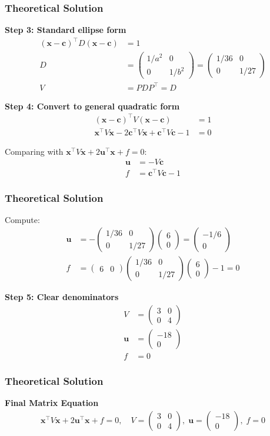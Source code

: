 \documentclass{beamer}
\theoremstyle{remark}
\newcommand{\myvec}[1]{\ensuremath{\begin{pmatrix}#1\end{pmatrix}}}
\let\vec\mathbf
\numberwithin{equation}{section}
\begin{document}
\begin{frame}
\frametitle{Theoretical Solution}
\textbf{Step 3: Standard ellipse form}
\begin{align}
(\vec{x}-\vec{c})^\top D (\vec{x}-\vec{c}) &= 1 \\[6pt]
D &= \myvec{1/a^2 & 0 \\ 0 & 1/b^2} 
= \myvec{1/36 & 0 \\ 0 & 1/27} \\[6pt]
V &= P D P^\top = D
\end{align}

\textbf{Step 4: Convert to general quadratic form}
\begin{align}
(\vec{x}-\vec{c})^\top V (\vec{x}-\vec{c}) &= 1 \\[6pt]
\vec{x}^\top V \vec{x} - 2 \vec{c}^\top V \vec{x} + \vec{c}^\top V \vec{c} - 1 &= 0
\end{align}

Comparing with $\vec{x}^\top V \vec{x} + 2 \vec{u}^\top \vec{x} + f = 0$:
\begin{align}
\vec{u} &= -V\vec{c} \\[6pt]
f &= \vec{c}^\top V \vec{c} - 1
\end{align}
\end{frame}

\begin{frame}
\frametitle{Theoretical Solution}
Compute:
\begin{align}
\vec{u} &= -\myvec{1/36 & 0 \\ 0 & 1/27}\myvec{6\\0} 
= \myvec{-1/6\\0} \\[6pt]
f &= \myvec{6 & 0}\myvec{1/36 & 0 \\ 0 & 1/27}\myvec{6\\0} - 1 = 0
\end{align}

\textbf{Step 5: Clear denominators}
\begin{align}
V &= \myvec{3 & 0 \\ 0 & 4} \\[6pt]
\vec{u} &= \myvec{-18 \\ 0} \\[6pt]
f &= 0
\end{align}

\end{frame}

\begin{frame}
\frametitle{Theoretical Solution}
\textbf{Final Matrix Equation}
\begin{align}
\boxed{ \; \vec{x}^\top V \vec{x} + 2 \vec{u}^\top \vec{x} + f = 0, \quad
V = \myvec{3 & 0 \\ 0 & 4}, \;
\vec{u} = \myvec{-18 \\ 0}, \;
f = 0 \; }
\end{align}

\end{frame}
\end{document}
